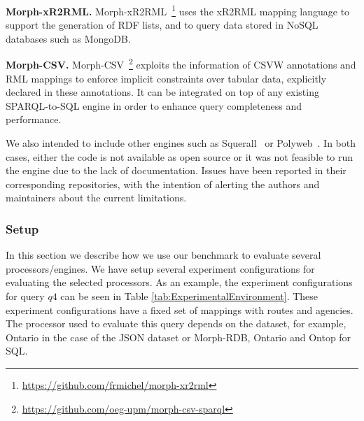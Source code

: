 \noindent\textbf{Morph-xR2RML.} Morph-xR2RML~\citep{michel2015translation}\footnote{\url{https://github.com/frmichel/morph-xr2rml}} uses the xR2RML mapping language to support the generation of RDF lists, and to query data stored in NoSQL databases such as MongoDB.

\noindent\textbf{Morph-CSV.} Morph-CSV~\citep{chaves2020enhancing}\footnote{\url{https://github.com/oeg-upm/morph-csv-sparql}} exploits the information of CSVW annotations and RML mappings to enforce implicit constraints over tabular data, explicitly declared in these annotations. It can be integrated on top of any existing SPARQL-to-SQL engine in order to enhance query completeness and performance.

We also intended to include other engines such as Squerall~\citep{mami2019querying} or Polyweb~\citep{khan2019one}. In both cases, either the code is not available as open source or it was not feasible to run the engine due to the lack of documentation. Issues have been reported in their corresponding repositories, with the intention of alerting the authors and maintainers about the current limitations.

\subsubsection{Setup}
In this section we describe how we use our benchmark to evaluate several processors/engines. We have setup several experiment configurations for evaluating the selected processors. As an example, the experiment configurations for query $q4$ can be seen in Table \ref{tab:ExperimentalEnvironment}. These experiment configurations have a fixed set of mappings with routes and agencies. The processor used to evaluate this query depends on the dataset, for example, Ontario in the case of the JSON dataset or Morph-RDB, Ontario and Ontop for SQL.

